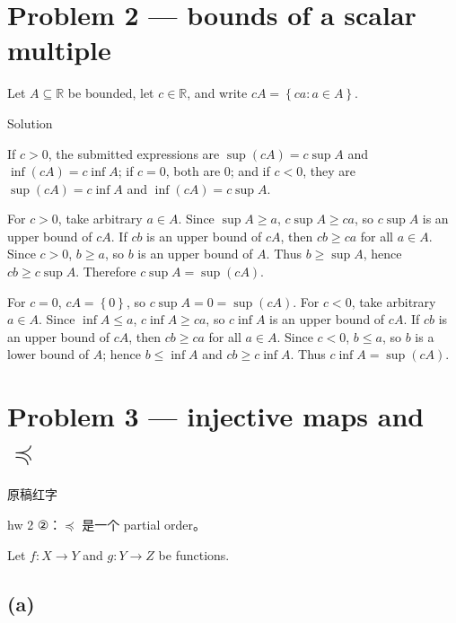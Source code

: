 \section{Problem 2 --- bounds of a scalar multiple}

Let \(A \subseteq \mathbb{R}\) be bounded, let \(c \in \mathbb{R}\), and write \(cA = \left\{ {ca:a \in A} \right\}\).

\begin{qlsolution}{Solution}

If \(c > 0\), the submitted expressions are \(\sup\left( {cA} \right) = c\sup A\) and \(\inf\left( {cA} \right) = c\inf A\); if \(c = 0\), both are \(0\); and if \(c < 0\), they are \(\sup\left( {cA} \right) = c\inf A\) and \(\inf\left( {cA} \right) = c\sup A\).

For \(c > 0\), take arbitrary \(a \in A\). Since \(\sup A \geq a\), \(c\sup A \geq ca\), so \(c\sup A\) is an upper bound of \(cA\). If \(cb\) is an upper bound of \(cA\), then \(cb \geq ca\) for all \(a \in A\). Since \(c > 0\), \(b \geq a\), so \(b\) is an upper bound of \(A\). Thus \(b \geq \sup A\), hence \(cb \geq c\sup A\). Therefore \(c\sup A = \sup\left( {cA} \right)\).

For \(c = 0\), \(cA = \left\{ 0 \right\}\), so \(c\sup A = 0 = \sup\left( {cA} \right)\). For \(c < 0\), take arbitrary \(a \in A\). Since \(\inf A \leq a\), \(c\inf A \geq ca\), so \(c\inf A\) is an upper bound of \(cA\). If \(cb\) is an upper bound of \(cA\), then \(cb \geq ca\) for all \(a \in A\). Since \(c < 0\), \(b \leq a\), so \(b\) is a lower bound of \(A\); hence \(b \leq \inf A\) and \(cb \geq c\inf A\). Thus \(c\inf A = \sup\left( {cA} \right)\).

\end{qlsolution}

\section{\texorpdfstring{Problem 3 --- injective maps and \(\preceq\)}{Problem 3 --- injective maps and \textbackslash preceq}}

\begin{qlnote}{原稿红字}

hw 2 ②：\(\preceq\) 是一个 partial order。

\end{qlnote}

Let \(f:X\rightarrow Y\) and \(g:Y\rightarrow Z\) be functions.

\subsection{(a)}

